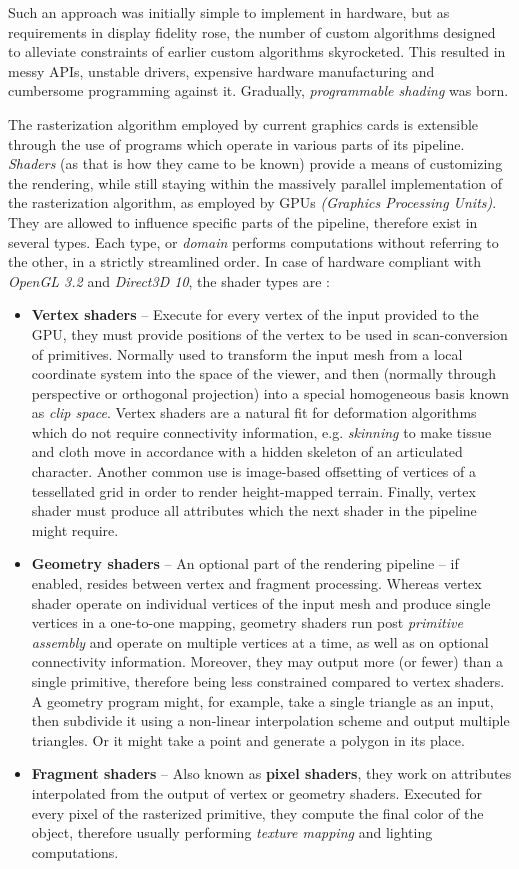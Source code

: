 Such an approach was initially simple to implement in hardware, but as requirements in display fidelity rose, the number of custom algorithms designed to alleviate constraints of earlier custom algorithms skyrocketed. This resulted in messy APIs, unstable drivers, expensive hardware manufacturing and cumbersome programming against it. Gradually, \emph{programmable shading} was born.

The rasterization algorithm employed by current graphics cards is extensible through the use of programs which operate in various parts of its pipeline. \emph{Shaders} (as that is how they came to be known) provide a means of customizing the rendering, while still staying within the massively parallel implementation of the rasterization algorithm, as employed by GPUs \emph{(Graphics Processing Units)}. They are allowed to influence specific parts of the pipeline, therefore exist in several types. Each type, or \emph{domain} performs computations without referring to the other, in a strictly streamlined order. In case of hardware compliant with \emph{OpenGL 3.2} and \emph{Direct3D 10}, the shader types are \cite{glspec32, SM4}:
\begin{itemize}
\item \textbf{Vertex shaders} -- Execute for every vertex of the input provided to the GPU, they must provide positions of the vertex to be used in scan-conversion of primitives. Normally used to transform the input mesh from a local coordinate system into the space of the viewer, and then (normally through perspective or orthogonal projection) into a special homogeneous basis known as \emph{clip space}. Vertex shaders are a natural fit for deformation algorithms which do not require connectivity information, e.g. \emph{skinning} to make tissue and cloth move in accordance with a hidden skeleton of an articulated character. Another common use is image-based offsetting of vertices of a tessellated grid in order to render height-mapped terrain. Finally, vertex shader must produce all attributes which the next shader in the pipeline might require.
\item \textbf{Geometry shaders} -- An optional part of the rendering pipeline -- if enabled, resides between vertex and fragment processing. Whereas vertex shader operate on individual vertices of the input mesh and produce single vertices in a one-to-one mapping, geometry shaders run post \emph{primitive assembly} and operate on multiple vertices at a time, as well as on optional connectivity information. Moreover, they may output more (or fewer) than a single primitive, therefore being less constrained compared to vertex shaders. A geometry program might, for example, take a single triangle as an input, then subdivide it using a non-linear interpolation scheme and output multiple triangles. Or it might take a point and generate a polygon in its place.
\item \textbf{Fragment shaders} -- Also known as \textbf{pixel shaders}, they work on attributes interpolated from the output of vertex or geometry shaders. Executed for every pixel of the rasterized primitive, they compute the final color of the object, therefore usually performing \emph{texture mapping} and lighting computations.
\end{itemize}


